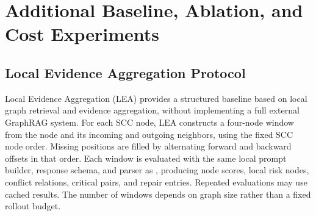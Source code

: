 
\section{Additional Baseline, Ablation, and Cost Experiments}
\label{app:revision_experiments}

\subsection{Local Evidence Aggregation Protocol}
\label{app:revision_lea}

Local Evidence Aggregation (LEA) provides a structured baseline based on local graph retrieval and evidence aggregation, without implementing a full external GraphRAG system. For each SCC node, LEA constructs a four-node window from the node and its incoming and outgoing neighbors, using the fixed SCC node order. Missing positions are filled by alternating forward and backward offsets in that order. Each window is evaluated with the same local prompt builder, response schema, and parser as \samcgs{}, producing node scores, local risk nodes, conflict relations, critical pairs, and repair entries. Repeated evaluations may use cached results. The number of windows depends on graph size rather than a fixed rollout budget.

